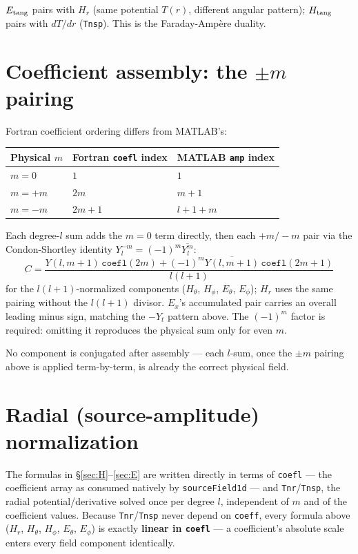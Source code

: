 \documentclass[11pt]{article}
\begin{document}
$E_{\rm tang}$ pairs with $H_r$ (same potential $T(r)$, different angular pattern); $H_{\rm tang}$
pairs with $dT/dr$ (\texttt{Tnsp}). This is the Faraday-Amp\`ere duality.

\section{Coefficient assembly: the $\pm m$ pairing}
\label{sec:pairing}

Fortran coefficient ordering differs from MATLAB's:

\begin{table}[h]
\centering
\begin{tabular}{lll}
\toprule
Physical $m$ & Fortran \texttt{coefl} index & MATLAB \texttt{amp} index \\
\midrule
$m=0$   & $1$     & $1$ \\
$m=+m$  & $2m$    & $m{+}1$ \\
$m=-m$  & $2m{+}1$ & $l{+}1{+}m$ \\
\bottomrule
\end{tabular}
\end{table}

Each degree-$l$ sum adds the $m=0$ term directly, then each $+m/-m$ pair via the Condon-Shortley
identity $Y_l^{-m}=(-1)^m\overline{Y_l^m}$:
\begin{equation}
C = \frac{Y(l,m{+}1)\,\mathtt{coefl}(2m) + (-1)^m\overline{Y(l,m{+}1)}\,\mathtt{coefl}(2m{+}1)}{l(l{+}1)}
\end{equation}
for the $l(l{+}1)$-normalized components ($H_\theta$, $H_\phi$, $E_\theta$, $E_\phi$); $H_r$ uses
the same pairing without the $l(l{+}1)$ divisor. $E_x$'s accumulated pair carries an overall
leading minus sign, matching the $-Y_t$ pattern above. The $(-1)^m$ factor is required: omitting
it reproduces the physical sum only for even $m$.

No component is conjugated after assembly --- each $l$-sum, once the $\pm m$ pairing above is
applied term-by-term, is already the correct physical field.

\section{Radial (source-amplitude) normalization}
\label{sec:radial}

The formulas in \S\ref{sec:H}--\ref{sec:E} are written directly in terms of \texttt{coefl} ---
the coefficient array as consumed natively by \texttt{sourceField1d} --- and
\texttt{Tnr}/\texttt{Tnsp}, the radial potential/derivative solved once per degree $l$,
independent of $m$ and of the coefficient values. Because \texttt{Tnr}/\texttt{Tnsp} never depend
on \texttt{coeff}, every formula above ($H_r$, $H_\theta$, $H_\phi$, $E_\theta$, $E_\phi$) is
exactly \textbf{linear in \texttt{coefl}} --- a coefficient's absolute scale enters every field
component identically.
\end{document}
